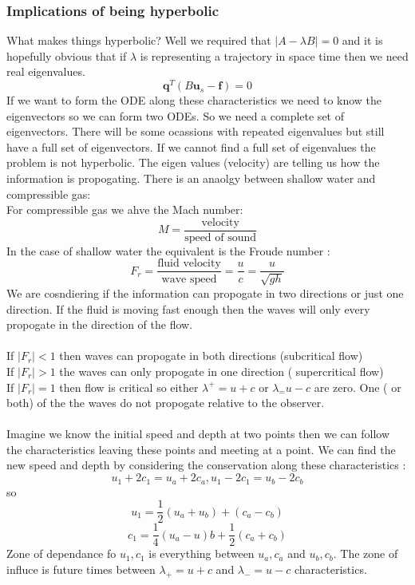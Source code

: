 \documentclass{article}
\begin{document}
  \subsubsection{Implications of being hyperbolic}
  What makes things hyperbolic? Well we required that $|A- \lambda B| = 0$ and it is hopefully obvious that if $\lambda$ is representing a trajectory in space time then we need real eigenvalues.
  $$
  \bm q^T ( B \bm u_s - \bm f ) = 0
  $$
  If we want to form the ODE along these characteristics we need to know the eigenvectors so we can form two ODEs. So we need a complete set of eigenvectors. There will be some ocassions with repeated eigenvalues but still have a full set of eigenvectors. If we cannot find a full set of eigenvalues the problem is not hyperbolic. The eigen values (velocity) are telling us how the information is propogating. There is an anaolgy between shallow water and compressible gas:\\
  For compressible gas we ahve the Mach number:
  $$
  M = \frac{\text{velocity}}{\text{speed of sound}}
  $$
In the case of shallow water the equivalent is the Froude number :
$$
 F_r = \frac{\text{fluid velocity}}{\text{wave speed}} = \frac{u}{c} = \frac{u}{\sqrt{gh}}
$$
We are cosndiering if the information can propogate in two directions or just one direction. If the fluid is moving fast enough then the waves will only every propogate in the direction of the flow.\\\\
If $|F_r| <1$ then waves can propogate in both directions (subcritical flow)\\
If $|F_r|>1$ the waves can only propogate in one direction ( supercritical flow)\\
If $|F_r| =1$ then flow is critical so either $\lambda^+ = u + c$ or $\lambda_ = u -c$ are zero. One ( or both) of the the waves do not propogate relative to the observer.\\\\
Imagine we know the initial speed and depth at two points then we can follow the characteristics leaving these points and meeting at a point. We can find the new speed and depth by considering the conservation along these characteristics :
$$
 u_1 + 2 c_1 = u_a + 2 c_a, u_1 - 2c_1 = u_b - 2c_b
$$
so 
$$
 u_1 = \frac{1}{2} ( u_a + u_b) + (c_a - c_b)
$$
$$
 c_1 = \frac{1}{4} ( u_a - u)b + \frac{1}{2} (c_a + c_b)
$$
Zone of dependance fo $u_1,c_1$ is everything between $u_a, c_a$ and $u_b, c_b$. The zone of influce is future times between $\lambda_+ = u+c$ and $\lambda_- = u-c$ characteristics.
\end{document}
